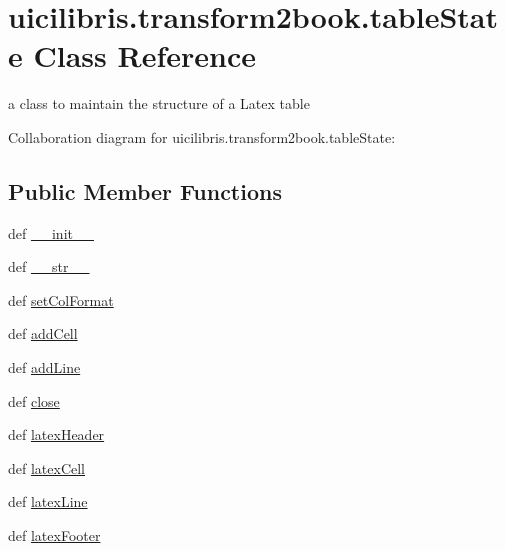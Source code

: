 \hypertarget{classuicilibris_1_1transform2book_1_1tableState}{\section{uicilibris.\-transform2book.\-table\-State \-Class \-Reference}
\label{classuicilibris_1_1transform2book_1_1tableState}
}


a class to maintain the structure of a \-Latex table  




\-Collaboration diagram for uicilibris.\-transform2book.\-table\-State\-:
\subsection*{\-Public \-Member \-Functions}
\begin{DoxyCompactItemize}
\item 
def \hyperlink{classuicilibris_1_1transform2book_1_1tableState_a207cca159690f55ec655e05bb6c1f910}{\-\_\-\-\_\-init\-\_\-\-\_\-}
\item 
def \hyperlink{classuicilibris_1_1transform2book_1_1tableState_a747b1c135b814bb8c5a98a3eb132b709}{\-\_\-\-\_\-str\-\_\-\-\_\-}
\item 
def \hyperlink{classuicilibris_1_1transform2book_1_1tableState_a9e344c6aa5de08786674427e4b4528f1}{set\-Col\-Format}
\item 
def \hyperlink{classuicilibris_1_1transform2book_1_1tableState_a6c4f86b941032bc0aa89b51b29638ebc}{add\-Cell}
\item 
def \hyperlink{classuicilibris_1_1transform2book_1_1tableState_af2f85dfc9f633306469f62a9e4aa8f4c}{add\-Line}
\item 
def \hyperlink{classuicilibris_1_1transform2book_1_1tableState_af02a290d62366eb2b15890e590825893}{close}
\item 
def \hyperlink{classuicilibris_1_1transform2book_1_1tableState_a5cd2ae2646ff8c2715becca7cdce1b47}{latex\-Header}
\item 
def \hyperlink{classuicilibris_1_1transform2book_1_1tableState_af7f44e5c9088ea9ff70f83efb7c4fdc8}{latex\-Cell}
\item 
def \hyperlink{classuicilibris_1_1transform2book_1_1tableState_a0b2d0a4d64010f6dbae80dfd0c7dcd71}{latex\-Line}
\item 
def \hyperlink{classuicilibris_1_1transform2book_1_1tableState_a63e41f1cc87c19a0a9a53d2dacb9edca}{latex\-Footer}
\end{DoxyCompactItemize}
